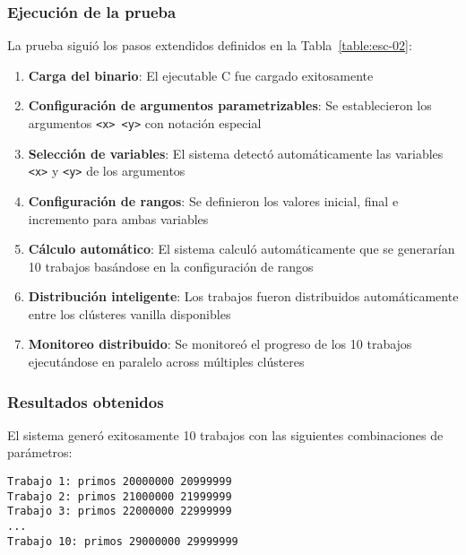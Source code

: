 \subsubsection{Ejecución de la prueba}
\noindent

La prueba siguió los pasos extendidos definidos en la Tabla~\ref{table:esc-02}:

\begin{enumerate}
	\item \textbf{Carga del binario}: El ejecutable C fue cargado exitosamente
	
	\item \textbf{Configuración de argumentos parametrizables}: Se establecieron los argumentos \texttt{<x> <y>} con notación especial
	
	\item \textbf{Selección de variables}: El sistema detectó automáticamente las variables \texttt{<x>} y \texttt{<y>} de los argumentos
	
	\item \textbf{Configuración de rangos}: Se definieron los valores inicial, final e incremento para ambas variables
	
	\item \textbf{Cálculo automático}: El sistema calculó automáticamente que se generarían 10 trabajos basándose en la configuración de rangos
	
	\item \textbf{Distribución inteligente}: Los trabajos fueron distribuidos automáticamente entre los clústeres vanilla disponibles
	
	\item \textbf{Monitoreo distribuido}: Se monitoreó el progreso de los 10 trabajos ejecutándose en paralelo across múltiples clústeres
\end{enumerate}

\subsubsection{Resultados obtenidos}
\noindent

El sistema generó exitosamente 10 trabajos con las siguientes combinaciones de parámetros:

\begin{verbatim}
Trabajo 1: primos 20000000 20999999
Trabajo 2: primos 21000000 21999999
Trabajo 3: primos 22000000 22999999
...
Trabajo 10: primos 29000000 29999999
\end{verbatim}

